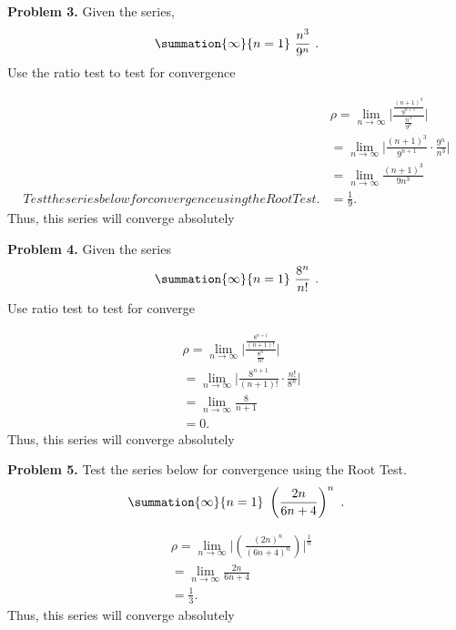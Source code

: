 \documentclass{report}
\begin{document}
    \pagebreak \bigbreak \noindent 
    \begin{mdframed}
        \textbf{Problem 3.} Given the series, 
        \begin{align*}
            \summation{\infty}{n=1}\ \frac{n^{3}}{9^{n}}\ 
        .\end{align*}
        \bigbreak \noindent 
        Use the ratio test to test for convergence
    \end{mdframed}
    \bigbreak \noindent 
    \begin{align*}
        &\rho = \lim\limits_{n \to \infty}{\bigg\lvert\frac{\frac{(n+1)^{3}}{9^{n+1}}}{\frac{n^{3}}{9^{n}}}\bigg\rvert } \\
        &=\lim\limits_{n \to \infty}{\bigg\lvert \frac{(n+1)^{3}}{9^{n+1}} \cdot  \frac{9^{n}}{n^{3}}\bigg\rvert} \\
        &=\lim\limits_{n \to \infty}{\frac{(n+1)^{3}}{9n^{3}}} \\
Test the series below for convergence using the Root Test.
        &=\frac{1}{9}
    .\end{align*}
    \bigbreak \noindent 
    Thus, this series will converge absolutely

    \bigbreak \noindent 
    \begin{mdframed}
        \textbf{Problem 4.} Given the series
        \begin{align*}
            \summation{\infty}{n=1}\ \frac{8^{n}}{n!}\ 
        .\end{align*}
        \bigbreak \noindent 
        Use ratio test to test for converge
    \end{mdframed}
   \bigbreak \noindent 
   \begin{align*}
       &\rho = \lim\limits_{n \to \infty}{\bigg\lvert \frac{\frac{8^{n+1}}{(n+1)!}}{\frac{8^{n}}{n!}} \bigg\rvert} \\
       &=\lim\limits_{n \to \infty}{\bigg\lvert \frac{8^{n+1}}{(n+1)!} \cdot \frac{n!}{8^{n}} \bigg\rvert} \\
       &=\lim\limits_{n \to \infty}{\frac{8}{n+1}} \\ 
       &=0
   .\end{align*}
   \bigbreak \noindent 
   Thus, this series will converge absolutely


   \pagebreak \bigbreak \noindent 
   \begin{mdframed}
       \textbf{Problem 5.} Test the series below for convergence using the Root Test.
       \begin{align*}
           \summation{\infty}{n=1}\ \left(\frac{2n}{6n+4}\right)^{n}\ 
       .\end{align*}
   \end{mdframed}
   \bigbreak \noindent 
   \begin{align*}
       &\rho = \lim\limits_{n \to \infty}{\bigg\lvert \left(\frac{(2n)^{n}}{(6n+4)^{n}}\right)\bigg\rvert^{\frac{1}{n}}} \\
       &=\lim\limits_{n \to \infty}{\frac{2n}{6n+4}} \\
       &=\frac{1}{3}
   .\end{align*}
   \bigbreak \noindent 
   Thus, this series will converge absolutely
\end{document}
